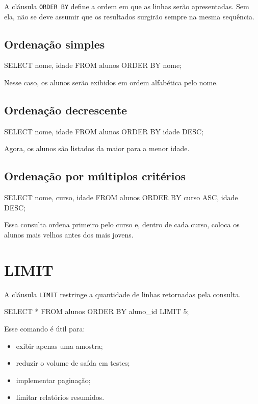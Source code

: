 A cláusula \texttt{ORDER BY} define a ordem em que as linhas serão apresentadas. Sem ela, não se deve assumir que os resultados surgirão sempre na mesma sequência.

\subsection{Ordenação simples}

\begin{sqlcode}
SELECT nome, idade
FROM alunos
ORDER BY nome;
\end{sqlcode}

Nesse caso, os alunos serão exibidos em ordem alfabética pelo nome.

\subsection{Ordenação decrescente}

\begin{sqlcode}
SELECT nome, idade
FROM alunos
ORDER BY idade DESC;
\end{sqlcode}

Agora, os alunos são listados da maior para a menor idade.

\subsection{Ordenação por múltiplos critérios}

\begin{sqlcode}
SELECT nome, curso, idade
FROM alunos
ORDER BY curso ASC, idade DESC;
\end{sqlcode}

Essa consulta ordena primeiro pelo curso e, dentro de cada curso, coloca os alunos mais velhos antes dos mais jovens.

\section{LIMIT}

A cláusula \texttt{LIMIT} restringe a quantidade de linhas retornadas pela consulta.

\begin{sqlcode}
SELECT *
FROM alunos
ORDER BY aluno_id
LIMIT 5;
\end{sqlcode}

Esse comando é útil para:
\begin{itemize}
    \item exibir apenas uma amostra;
    \item reduzir o volume de saída em testes;
    \item implementar paginação;
    \item limitar relatórios resumidos.
\end{itemize}

